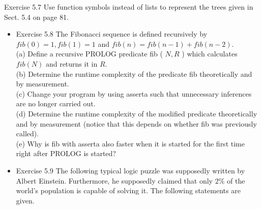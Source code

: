 \documentclass[10pt]{book}
\begin{document}
Exercise 5.7 Use function symbols instead of lists to represent the trees given in Sect. 5.4 on page 81.

\begin{itemize}
  \item Exercise 5.8 The Fibonacci sequence is defined recursively by $f i b(0)=1, f i b(1)=1$ and $f i b(n)=f i b(n-1)+f i b(n-2)$.\\
(a) Define a recursive PROLOG predicate fib ( $N, R$ ) which calculates $f i b(N)$ and returns it in $R$.\\
(b) Determine the runtime complexity of the predicate fib theoretically and by measurement.\\
(c) Change your program by using asserta such that unnecessary inferences are no longer carried out.\\
(d) Determine the runtime complexity of the modified predicate theoretically and by measurement (notice that this depends on whether fib was previously called).\\
(e) Why is fib with asserta also faster when it is started for the first time right after PROLOG is started?
  \item Exercise 5.9 The following typical logic puzzle was supposedly written by Albert Einstein. Furthermore, he supposedly claimed that only $2 \%$ of the world's population is capable of solving it. The following statements are given.
\end{itemize}
\end{document}
